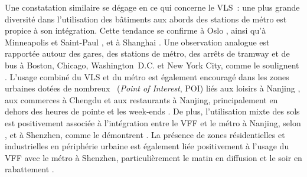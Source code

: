 \begin{refsegment}
Une constatation similaire se dégage en ce qui concerne le \acrshort{VLS}~: une plus grande diversité dans l'utilisation des bâtiments aux abords des stations de métro est propice à son intégration. Cette tendance se confirme à Oslo \textcolor{blue}{\autocite[395]{bocker_bike_2020}}, ainsi qu'à Minneapolis et Saint-Paul \textcolor{blue}{\autocite[8]{song_investigating_2020}}, et à Shanghai \textcolor{blue}{\autocite[10]{yu_policy_2021}}. Une observation analogue est rapportée autour des gares, des stations de métro, des arrêts de tramway et de bus à Boston, Chicago, Washington~D.C. et New York City, comme le soulignent \textcolor{blue}{\textcite[16]{kong_deciphering_2020}}. L'usage combiné du \acrshort{VLS} et du métro est également encouragé dans les zones urbaines dotées de nombreux ~(\textsl{Point of Interest}, POI) liés aux loisirs à Nanjing \textcolor{blue}{\autocite[15-17]{ji_exploring_2018}}, aux commerces à Chengdu \textcolor{blue}{\autocite[889]{bi_analysis_2021}} et aux restaurants à Nanjing, principalement en dehors des heures de pointe et les week-ends \textcolor{blue}{\autocite[11-13]{chen_what_2022}}. De plus, l'utilisation mixte des sols est positivement associée à l'intégration entre le \acrshort{VFF} et le métro à Nanjing, selon \textcolor{blue}{\textcite[12]{liu_use_2020}}, et à Shenzhen, comme le démontrent \textcolor{blue}{\textcite[6]{wang_relationship_2020}}. La présence de zones résidentielles et industrielles en périphérie urbaine est également liée positivement à l'usage du \acrshort{VFF} avec le métro à Shenzhen, particulièrement le matin en diffusion et le soir en rabattement \textcolor{blue}{\autocites[10]{guo_built_2020}[389]{guo_role_2021}}.%


\end{refsegment}
